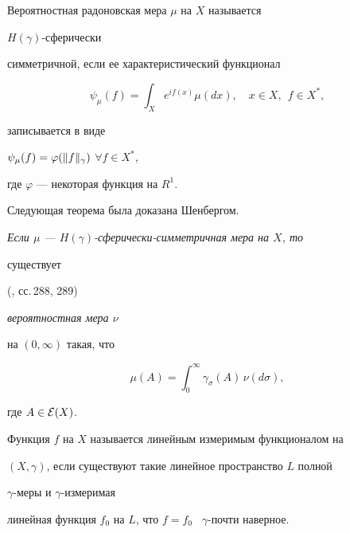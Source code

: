 \begin{defn}


Вероятностная радоновская мера $\mu$ на $X$ называется


$H(\gamma)$-сфе\-ри\-чески


симметричной, если ее характеристический функционал


$$


\psi_\mu(f)=\int_X e^{if(x)}\mu(dx),\quad x\in X,\ \ f\in X^*,


$$


записывается в виде


$\psi_\mu(f)=\varphi(\|f\|_\gamma)$ $\forall f\in X^*$,


где $\varphi$ --- некоторая функция на $R^1$.


\end{defn}





Следующая теорема была доказана Шенбергом.





{\it Если $\mu$ --- $H(\gamma)$-сферически-симметричная мера на $X$, то 


существует} (\cite{Bogach}, сс.\,288, 289) {\it вероятностная мера $\nu$


на $(0,\infty)$ такая, что


\begin{equation}


\mu(A)=\int_0^\infty\gamma_\sigma(A)\,\nu(d\sigma),


\label{measure}


\end{equation}


где $A\in{\cal E}(X)$.


}





\begin{defn}


Функция $f$ на $X$ называется линейным измеримым функционалом на


$(X,\gamma)$, если существуют такие линейное пространство $L$ полной


$\gamma$-меры и $\gamma$-измеримая


линейная функция $f_0$ на $L$, что $f=f_0$ \ $\gamma$-почти наверное.


\end{defn}





